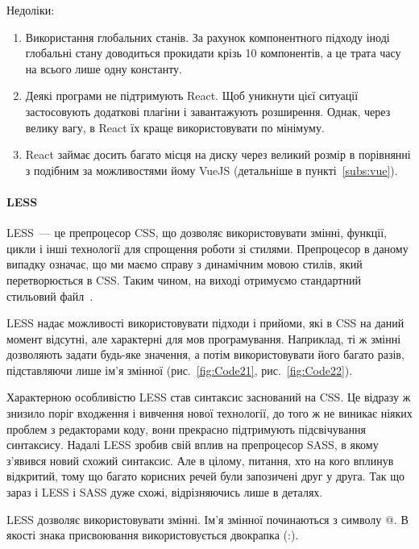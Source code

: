 Недоліки:
\begin{enumerate}
    \item Використання глобальних станів. За рахунок компонентного підходу іноді глобальні стану доводиться прокидати крізь 10 компонентів, а це трата часу на всього лише одну константу. 
    \item Деякі програми не підтримують React. Щоб уникнути цієї ситуації застосовують додаткові плагіни і завантажують розширення. Однак, через велику вагу, в React їх краще використовувати по мінімуму. 
    \item React займає досить багато місця на диску через великий розмір в порівнянні з подібним за можливостями йому VueJS (детальніше в пункті~\ref{subs:vue}).
\end{enumerate}

\paragraph{LESS}

LESS~--- це препроцесор CSS, що дозволяє використовувати змінні, функції, цикли і інші технології для спрощення роботи зі стилями. Препроцесор в даному випадку означає, що ми маємо справу з динамічним мовою стилів, який перетворюється в CSS. Таким чином, на виході отримуємо стандартний стильовий файл~\cite{9781782160663}.

LESS надає можливості використовувати підходи і прийоми, які в CSS на даний момент відсутні, але характерні для мов програмування. Наприклад, ті ж змінні дозволяють задати будь-яке значення, а потім використовувати його багато разів, підставляючи лише ім'я змінної (рис.~\ref{fig:Code21}, рис.~\ref{fig:Code22}).

Характерною особливістю LESS став синтаксис заснований на CSS. Це відразу ж знизило поріг входження і вивчення нової технології, до того ж не виникає ніяких проблем з редакторами коду, вони прекрасно підтримують підсвічування синтаксису. Надалі LESS зробив свій вплив на препроцесор SASS, в якому з'явився новий схожий синтаксис. Але в цілому, питання, хто на кого вплинув відкритий, тому що багато корисних речей були запозичені друг у друга. Так що зараз і LESS і SASS дуже схожі, відрізняючись лише в деталях.

LESS дозволяє використовувати змінні. Ім'я змінної починаються з символу @. В якості знака присвоювання використовується двокрапка (:).


